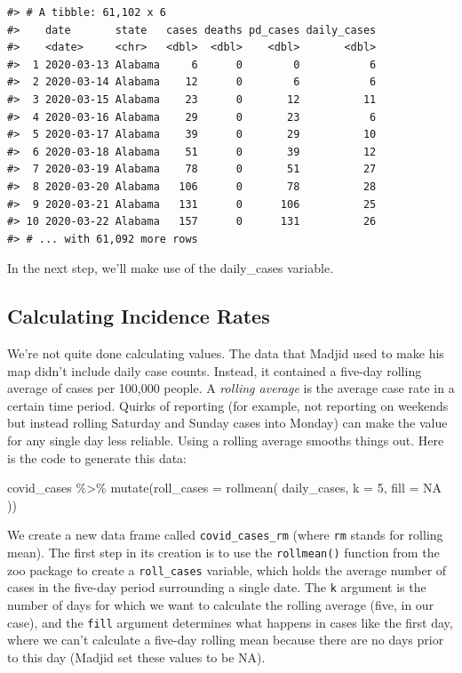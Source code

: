 \documentclass[
]{book}
\newenvironment{Shaded}{\begin{snugshade}}{\end{snugshade}}
\newcommand{\AttributeTok}[1]{\textcolor[rgb]{0.77,0.63,0.00}{#1}}
\newcommand{\ConstantTok}[1]{\textcolor[rgb]{0.00,0.00,0.00}{#1}}
\newcommand{\DecValTok}[1]{\textcolor[rgb]{0.00,0.00,0.81}{#1}}
\newcommand{\FunctionTok}[1]{\textcolor[rgb]{0.00,0.00,0.00}{#1}}
\newcommand{\NormalTok}[1]{#1}
\newcommand{\SpecialCharTok}[1]{\textcolor[rgb]{0.00,0.00,0.00}{#1}}
\begin{document}
\begin{verbatim}
#> # A tibble: 61,102 x 6
#>    date       state   cases deaths pd_cases daily_cases
#>    <date>     <chr>   <dbl>  <dbl>    <dbl>       <dbl>
#>  1 2020-03-13 Alabama     6      0        0           6
#>  2 2020-03-14 Alabama    12      0        6           6
#>  3 2020-03-15 Alabama    23      0       12          11
#>  4 2020-03-16 Alabama    29      0       23           6
#>  5 2020-03-17 Alabama    39      0       29          10
#>  6 2020-03-18 Alabama    51      0       39          12
#>  7 2020-03-19 Alabama    78      0       51          27
#>  8 2020-03-20 Alabama   106      0       78          28
#>  9 2020-03-21 Alabama   131      0      106          25
#> 10 2020-03-22 Alabama   157      0      131          26
#> # ... with 61,092 more rows
\end{verbatim}

In the next step, we'll make use of the daily\_cases variable.

\hypertarget{calculating-incidence-rates}{%
\subsection*{Calculating Incidence Rates}\label{calculating-incidence-rates}}

We're not quite done calculating values. The data that Madjid used to make his map didn't include daily case counts. Instead, it contained a five-day rolling average of cases per 100,000 people. A \emph{rolling average} is the average case rate in a certain time period. Quirks of reporting (for example, not reporting on weekends but instead rolling Saturday and Sunday cases into Monday) can make the value for any single day less reliable. Using a rolling average smooths things out. Here is the code to generate this data:

\begin{Shaded}
\begin{Highlighting}[]
\NormalTok{covid\_cases }\SpecialCharTok{\%\textgreater{}\%}
  \FunctionTok{mutate}\NormalTok{(}\AttributeTok{roll\_cases =} \FunctionTok{rollmean}\NormalTok{(}
\NormalTok{    daily\_cases,}
    \AttributeTok{k =} \DecValTok{5}\NormalTok{,}
    \AttributeTok{fill =} \ConstantTok{NA}
\NormalTok{  ))}
\end{Highlighting}
\end{Shaded}

We create a new data frame called \texttt{covid\_cases\_rm} (where \texttt{rm} stands for rolling mean). The first step in its creation is to use the \texttt{rollmean()} function from the zoo package to create a \texttt{roll\_cases} variable, which holds the average number of cases in the five-day period surrounding a single date. The \texttt{k} argument is the number of days for which we want to calculate the rolling average (five, in our case), and the \texttt{fill} argument determines what happens in cases like the first day, where we can't calculate a five-day rolling mean because there are no days prior to this day (Madjid set these values to be NA).
\end{document}
